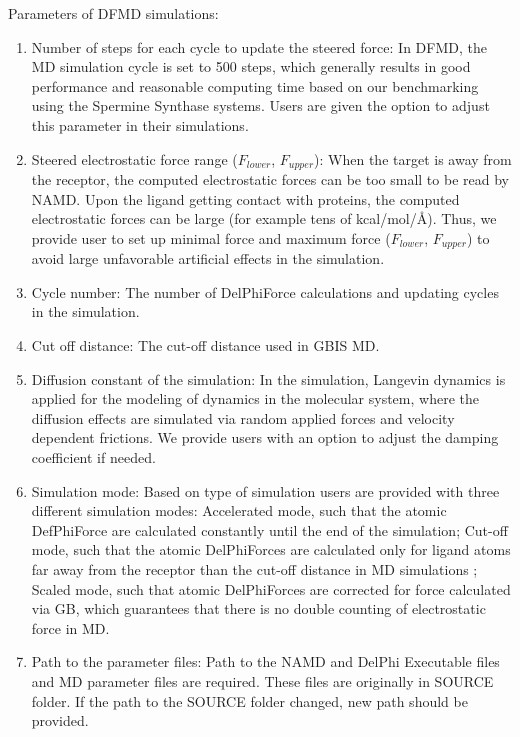 \documentclass[9pt,tutorial]{livecoms}
\begin{document}
Parameters of DFMD simulations:
\begin{enumerate}
\item Number of steps for each cycle to update the steered force: In DFMD, the MD simulation cycle is set to 500 steps, which generally results in good performance and reasonable computing time based on our benchmarking using the Spermine Synthase systems. Users are given the option to adjust this parameter in their simulations.

\item Steered electrostatic force range ($ F_{lower} $, $ F_{upper} $): When the target is away from the receptor, the computed electrostatic forces can be too small to be read by NAMD. Upon the ligand getting contact with proteins, the computed electrostatic forces can be large (for example tens of kcal/mol/Å). Thus, we provide user to set up minimal force and maximum force ($ F_{lower} $, $ F_{upper}$) to avoid large unfavorable artificial effects in the simulation.

\item Cycle number: The number of DelPhiForce calculations and updating cycles in the simulation.

\item Cut off distance: The cut-off distance used in GBIS MD.

\item Diffusion constant of the simulation: In the simulation, Langevin dynamics is applied for the modeling of dynamics in the molecular system, where the diffusion effects are simulated via random applied forces and velocity dependent frictions. We provide users with an option to adjust the damping coefficient if needed.

\item Simulation mode: Based on type of simulation users are provided with three different simulation modes: Accelerated mode, such that the atomic DefPhiForce are calculated constantly until the end of the simulation; Cut-off mode, such that the atomic DelPhiForces are calculated only for ligand atoms far away from the receptor than the cut-off distance in MD simulations ; Scaled mode, such that atomic DelPhiForces are corrected for force calculated via GB, which guarantees that there is no double counting of electrostatic force in MD.

\item Path to the parameter files: Path to the NAMD and DelPhi Executable files and MD parameter files are required. These files are originally in SOURCE folder. If the path to the SOURCE folder changed, new path should be provided.


\end{enumerate}
\end{document}
